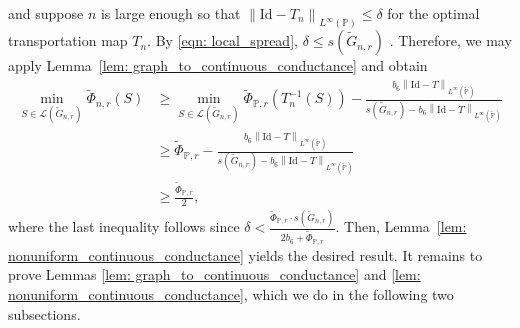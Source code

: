 \documentclass[11pt,twoside]{article}
\newcommand{\norm}[1]{\left\lVert#1\right\rVert}
\newcommand{\1}{\mathbbm{1}}
\newcommand{\Pbb}{\mathbb{P}}
\begin{document}
and suppose $n$ is large enough so that $\norm{\mathrm{Id} - T_n}_{L^{\infty}(\Pbb)} \leq \delta$ for the optimal transportation map $T_n$.
By \eqref{eqn: local_spread}, $\delta \leq s(\widetilde{G}_{n,r})$ . Therefore, we may apply Lemma~\ref{lem: graph_to_continuous_conductance} and obtain
\begin{align*}
\min_{S \in \mathcal{L}(\widetilde{G}_{n,r})} \widetilde{\Phi}_{n,r}(S) & \geq \min_{S \in \mathcal{L}(\widetilde{G}_{n,r})} \widetilde{\Phi}_{\Pbb,r}(T_n^{-1}(S)) - \frac{b_6 \norm{\mathrm{Id} - T}_{L^{\infty}(\widetilde{\Pbb})} }{s(\widetilde{G}_{n,r}) - b_6\norm{\mathrm{Id} - T}_{L^{\infty}(\widetilde{\Pbb})}} \\
& \geq  \widetilde{\Phi}_{\Pbb,r} -  \frac{b_6 \norm{\mathrm{Id} - T}_{L^{\infty}(\widetilde{\Pbb})} }{s(\widetilde{G}_{n,r}) - b_6\norm{\mathrm{Id} - T}_{L^{\infty}(\widetilde{\Pbb})}} \\
& \geq \frac{\widetilde{\Phi}_{\Pbb,r}}{2},
\end{align*}
where the last inequality follows since $\delta < \frac{\widetilde{\Phi}_{\Pbb,r}\cdot s(\widetilde{G}_{n,r})}{2b_6 + \widetilde{\Phi}_{\Pbb,r}}$. Then, Lemma~\ref{lem: nonuniform_continuous_conductance} yields the desired result. It remains to prove Lemmas \ref{lem: graph_to_continuous_conductance} and \ref{lem: nonuniform_continuous_conductance}, which we do in the following two subsections.
\end{document}
